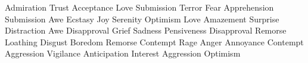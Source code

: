 {
\HL
{}
\NR
\HL
{}
\NC Admiration
\NC Trust
\NC Acceptance
\NC Love
\NC Submission
\NR
{}
\NC Terror
\NC Fear
\NC Apprehension
\NC Submission
\NC Awe
\NR
{}
\NC Ecstasy
\NC Joy
\NC Serenity
\NC Optimism
\NC Love
\NR
{}
\NC Amazement
\NC Surprise
\NC Distraction
\NC Awe
\NC Disapproval
\NR
{}
\NC Grief
\NC Sadness
\NC Pensiveness
\NC Disapproval
\NC Remorse
\NR
{}
\NC Loathing
\NC Disgust
\NC Boredom
\NC Remorse
\NC Contempt
\NR
{}
\NC Rage
\NC Anger
\NC Annoyance
\NC Contempt
\NC Aggression
\NR
{}
\NC Vigilance
\NC Anticipation
\NC Interest
\NC Aggression
\NC Optimism
\NR
\NR
\HL
\stoptabulate}